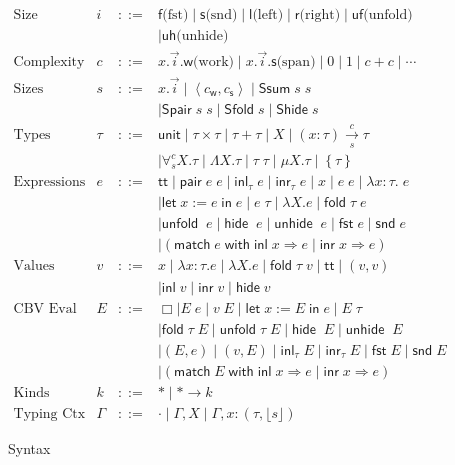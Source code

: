 \documentclass[preprint]{sigplanconf}
\newcommand{\thide}[1]{\left \{ #1 \right \}}
\newcommand{\arrow}[4]{#1\xrightarrow[#3]{#2}#4}
\newcommand{\symlet}{\mathsf{let\;}}
\newcommand{\symin}{\mathsf{\;in\;}}
\newcommand{\symmatch}{\mathsf{match}}
\newcommand{\symwith}{\mathsf{\;with\;}}
\newcommand{\syminl}{\mathsf{inl}}
\newcommand{\syminr}{\mathsf{inr}}
\newcommand{\symfold}{\mathsf{fold\;}}
\newcommand{\symSfold}{\mathsf{Sfold}}
\newcommand{\symunfold}{\mathsf{unfold\;}}
\newcommand{\symhide}{\mathsf{hide\;}}
\newcommand{\symShide}{\mathsf{Shide}}
\newcommand{\symunhide}{\mathsf{unhide\;}}
\newcommand{\sympair}{\mathsf{pair}}
\newcommand{\symtt}{\mathsf{tt}}
\newcommand{\symunit}{\mathsf{unit}}
\newcommand{\intro}[2]{(#1 : #2)}
\newcommand{\symfst}{\mathsf{fst}}
\newcommand{\symsnd}{\mathsf{snd}}
\newcommand{\symuf}{\mathsf{uf}}
\newcommand{\symuh}{\mathsf{uh}}
\newcommand{\syml}{\mathsf{l}}
\newcommand{\symr}{\mathsf{r}}
\newcommand{\symf}{\mathsf{f}}
\newcommand{\syms}{\mathsf{s}}
\newcommand{\symSpair}{\mathsf{Spair}}
\newcommand{\symSlr}{\mathsf{Ssum}}
\newcommand{\symwork}{\mathsf{w}}
\newcommand{\symspan}{\mathsf{s}}
\newcommand{\Sstats}[1]{\left \langle #1 \right \rangle}
\newcommand{\optional}[1]{\lfloor #1 \rfloor}
\begin{document}
\begin{figure}
$$\begin{array}{rrcl}
  \textrm{Size Subpart Idx} & i &::=& \symf \textrm{(fst)} \mid \syms \textrm{(snd)} \mid \syml \textrm{(left)} \mid \symr \textrm{(right)} \mid \symuf \textrm{(unfold)} \\
  & & & \mid \symuh \textrm{(unhide)} \\
  \textrm{Complexity Expr} & c &::=& x.\vec{i}.\symwork \textrm{(work)} \mid x.\vec{i}.\symspan \textrm{(span)} \mid 0 \mid 1 \mid c+c \mid \cdots \\
  \textrm{Sizes} & s &::=& x.\vec{i} \mid \Sstats{c_\symwork,c_\symspan} \mid \symSlr\;s\;s \\
  & & & \mid \symSpair\;s\;s \mid \symSfold\;s \mid \symShide\;s \\
  \textrm{Types} & \tau &::=& \symunit \mid \tau\times\tau \mid \tau+\tau \mid X \mid \arrow{\intro{x}{\tau}}{c}{s}{\tau} \\
  & & & \mid \forall^c_s X.\tau \mid \Lambda X.\tau \mid \tau\;\tau \mid \mu X.\tau \mid \thide\tau \\
  \textrm{Expressions} & e &::=& \symtt \mid \sympair\;e\;e \mid \syminl_\tau\;e \mid \syminr_\tau\;e \mid x \mid e\;e \mid \lambda x:\tau.\;e \\
  & & & \mid \symlet x := e \symin e \mid e\;\tau \mid \lambda X.e \mid \symfold\tau\;e \\
  & & & \mid \symunfold\;e \mid \symhide\;e \mid \symunhide\;e \mid \symfst\;e \mid \symsnd\;e \\
  & & & \mid (\symmatch\;e\symwith\syminl\;x\Rightarrow e\;|\;\syminr\;x\Rightarrow e) \\
  \textrm{Values} & v &::=& x \mid \lambda x:\tau.e \mid \lambda X.e \mid \symfold\tau\;v \mid \symtt \mid (v,v) \\
  & & & \mid \syminl\;v \mid \syminr\;v \mid \symhide v \\
  \textrm{CBV Eval Ctx} & E &::=& \Box \mid E\;e \mid v\;E \mid \symlet x := E\symin e \mid E\;\tau \\
  & & & \mid \symfold\tau\;E \mid \symunfold\tau\;E \mid \symhide\;E \mid \symunhide\;E \\
  & & & \mid (E, e) \mid (v, E) \mid \syminl_\tau\;E \mid \syminr_\tau\;E \mid \symfst\;E \mid \symsnd\;E \\
  & & & \mid (\symmatch\;E\symwith\syminl\;x\Rightarrow e\;|\;\syminr\;x\Rightarrow e) \\
  \textrm{Kinds} & k &::=& * \mid *\to k \\
  \textrm{Typing Ctx} & \Gamma &::=& \cdot \mid \Gamma,X \mid \Gamma, x:(\tau, \optional{s})
\end{array}$$
\caption{\label{syntax}Syntax}
\end{figure}
\end{document}
